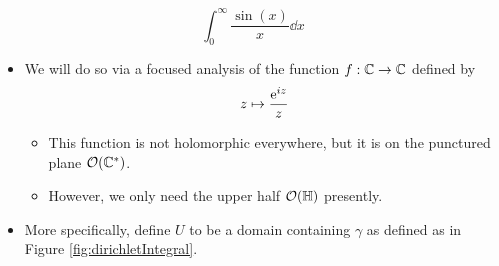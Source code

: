 \documentclass[../notes.tex]{subfiles}
\begin{document}
\begin{itemize}
    \begin{equation*}
        \int_0^\infty\frac{\sin(x)}{x}\dd{x}
    \end{equation*}
    \begin{itemize}
        \item We will do so via a focused analysis of the function $f:\C\to\C$ defined by
        \begin{equation*}
            z \mapsto \frac{\e[iz]}{z}
        \end{equation*}
        \begin{itemize}
            \item This function is not holomorphic everywhere, but it is on the punctured plane $\mO(\C^*)$.
            \item However, we only need the upper half $\mO(\Hh)$ presently.
        \end{itemize}
        \item More specifically, define $U$ to be a domain containing $\gamma$ as defined as in Figure \ref{fig:dirichletIntegral}.
        \begin{figure}[H]
            \centering
\end{figure}
\end{itemize}
\end{itemize}
\end{document}
